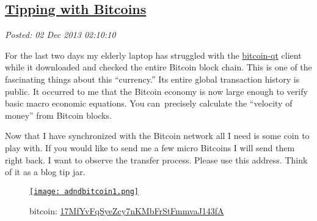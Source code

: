 %

\subsection*{\href{http://bakerjd99.wordpress.com/2013/12/01/tipping-with-bitcoins/}{Tipping with Bitcoins}}


\noindent\emph{Posted: 02 Dec 2013 02:10:10}
\vspace{6pt}

For the last two days my elderly laptop has struggled with
the \href{http://bitcoin.org/en/download}{bitcoin-qt} client while it
downloaded and checked the entire Bitcoin block chain. This is one of
the fascinating things about this ``currency.'' Its entire global
transaction history is public. It occurred to me that the Bitcoin
economy is now large enough to verify basic macro economic equations.
You can~precisely calculate the ``velocity of money'' from Bitcoin
blocks.

Now that I have synchronized with the Bitcoin network all I need is some
coin to play with. If you would like to send me a few micro Bitcoins I
will send them right back. I want to observe the transfer process.
Please use this address. Think of it as a blog tip jar.




\captionsetup[figure]{labelformat=empty}
\begin{figure}[htbp]
\centering
\href{https://blockchain.info/address/17MfYvFqSyeZcy7nKMbFrStFmmvaJ143fA}{\texttt{[image: adndbitcoin1.png]}}
\caption{bitcoin: \href{https://blockchain.info/address/17MfYvFqSyeZcy7nKMbFrStFmmvaJ143fA}{17MfYvFqSyeZcy7nKMbFrStFmmvaJ143fA}}
\label{fig:4347X0}
\end{figure}



%